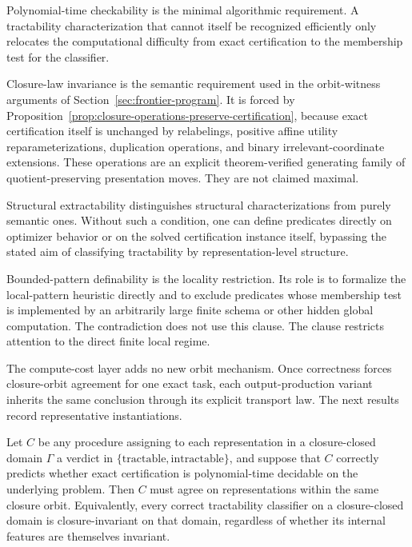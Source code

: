 Polynomial-time checkability is the minimal algorithmic requirement. A tractability characterization that cannot itself be recognized efficiently only relocates the computational difficulty from exact certification to the membership test for the classifier.

Closure-law invariance is the semantic requirement used in the orbit-witness arguments of Section~\ref{sec:frontier-program}. It is forced by Proposition~\ref{prop:closure-operations-preserve-certification}, because exact certification itself is unchanged by relabelings, positive affine utility reparameterizations, duplication operations, and binary irrelevant-coordinate extensions. These operations are an explicit theorem-verified generating family of quotient-preserving presentation moves. They are not claimed maximal.

Structural extractability distinguishes structural characterizations from purely semantic ones. Without such a condition, one can define predicates directly on optimizer behavior or on the solved certification instance itself, bypassing the stated aim of classifying tractability by representation-level structure.

Bounded-pattern definability is the locality restriction. Its role is to formalize the local-pattern heuristic directly and to exclude predicates whose membership test is implemented by an arbitrarily large finite schema or other hidden global computation. The contradiction does not use this clause. The clause restricts attention to the direct finite local regime.

The compute-cost layer adds no new orbit mechanism. Once correctness forces closure-orbit agreement for one exact task, each output-production variant inherits the same conclusion through its explicit transport law. The next results record representative instantiations.

\begin{theorem}\label{thm:correct-classifier-forces-invariance}
Let $C$ be any procedure assigning to each representation in a closure-closed domain $\Gamma$ a verdict in $\{\mathrm{tractable},\mathrm{intractable}\}$, and suppose that $C$ correctly predicts whether exact certification is polynomial-time decidable on the underlying problem. Then $C$ must agree on representations within the same closure orbit. Equivalently, every correct tractability classifier on a closure-closed domain is closure-invariant on that domain, regardless of whether its internal features are themselves invariant.
\end{theorem}

